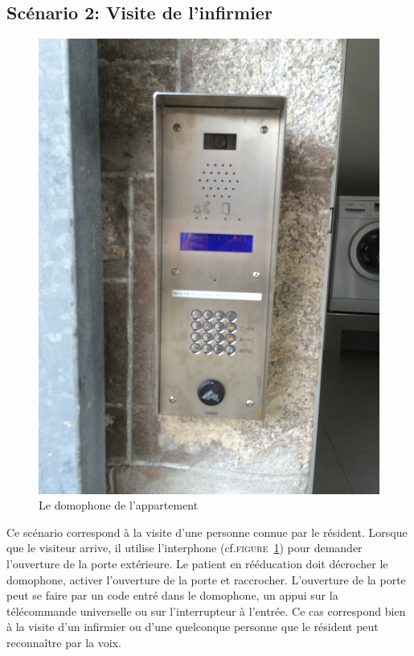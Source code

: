 \subsection{Scénario 2: Visite de l'infirmier}
\begin{figure}
  \includegraphics[scale=0.15]{1-PreEtude/img/interphone}
  \caption{Le domophone de l'appartement}
  \label{interphone}
\end{figure}
Ce scénario correspond à la visite d'une personne connue par le résident. Lorsque que le visiteur arrive, il utilise l'interphone (cf.\textsc{figure~\ref{interphone}}) pour demander l'ouverture de la porte extérieure. Le patient en rééducation doit décrocher le domophone, activer l'ouverture de la porte et raccrocher. L'ouverture de la porte peut se faire par un code entré dans le domophone, un appui sur la télécommande universelle ou sur l'interrupteur à l'entrée. Ce cas correspond bien à la visite d'un infirmier ou d'une quelconque personne que le résident peut reconnaître par la voix.

